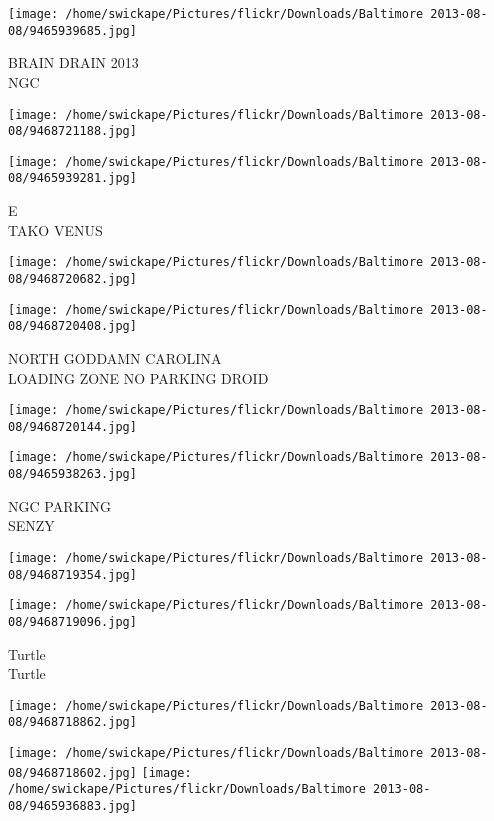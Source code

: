 \documentclass[10pt,letterpaper]{article}
\begin{document}
\vspace{0.25in}
\texttt{[image: /home/swickape/Pictures/flickr/Downloads/Baltimore 2013-08-08/9465939685.jpg]}

BRAIN DRAIN 2013\\
NGC
\pagebreak

\texttt{[image: /home/swickape/Pictures/flickr/Downloads/Baltimore 2013-08-08/9468721188.jpg]}

\vspace{0.25in}
\texttt{[image: /home/swickape/Pictures/flickr/Downloads/Baltimore 2013-08-08/9465939281.jpg]}

E\\
TAKO VENUS
\pagebreak

\texttt{[image: /home/swickape/Pictures/flickr/Downloads/Baltimore 2013-08-08/9468720682.jpg]}

\vspace{0.25in}
\texttt{[image: /home/swickape/Pictures/flickr/Downloads/Baltimore 2013-08-08/9468720408.jpg]}

NORTH GODDAMN CAROLINA\\
LOADING ZONE NO PARKING DROID
\pagebreak

\texttt{[image: /home/swickape/Pictures/flickr/Downloads/Baltimore 2013-08-08/9468720144.jpg]}

\vspace{0.25in}
\texttt{[image: /home/swickape/Pictures/flickr/Downloads/Baltimore 2013-08-08/9465938263.jpg]}

NGC PARKING\\
SENZY
\pagebreak

\texttt{[image: /home/swickape/Pictures/flickr/Downloads/Baltimore 2013-08-08/9468719354.jpg]}

\vspace{0.25in}
\texttt{[image: /home/swickape/Pictures/flickr/Downloads/Baltimore 2013-08-08/9468719096.jpg]}

Turtle\\
Turtle
\pagebreak

\texttt{[image: /home/swickape/Pictures/flickr/Downloads/Baltimore 2013-08-08/9468718862.jpg]}

\vspace{0.25in}
\texttt{[image: /home/swickape/Pictures/flickr/Downloads/Baltimore 2013-08-08/9468718602.jpg]}
\texttt{[image: /home/swickape/Pictures/flickr/Downloads/Baltimore 2013-08-08/9465936883.jpg]}
\end{document}
